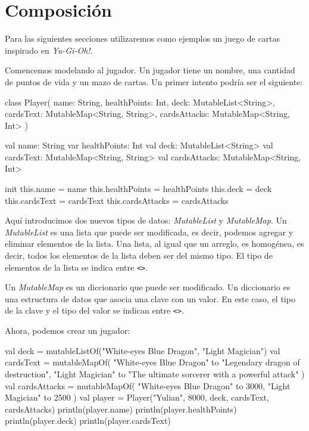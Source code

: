 \section{Composición}
  Para las siguientes secciones utilizaremos como ejemplos un juego de cartas inspirado en
  \textit{Yu-Gi-Oh!}.

  Comencemos modelando al jugador.
  Un jugador tiene un nombre, una cantidad de puntos de vida y un mazo de cartas.
  Un primer intento podría ser el siguiente:

  \begin{kotlin}
    class Player(
      name: String,
      healthPoints: Int,
      deck: MutableList<String>,
      cardsText: MutableMap<String, String>,
      cardsAttacks: MutableMap<String, Int>
    ) {
      val name: String
      var healthPoints: Int
      val deck: MutableList<String>
      val cardsText: MutableMap<String, String>
      val cardsAttacks: MutableMap<String, Int>

      init {
        this.name = name
        this.healthPoints = healthPoints
        this.deck = deck
        this.cardsText = cardsText
        this.cardsAttacks = cardsAttacks
      }
    }
  \end{kotlin}

  Aquí introducimos dos nuevos tipos de datos: \textit{MutableList} y \textit{MutableMap}.
  Un \textit{MutableList} es una lista que puede ser modificada, es decir, podemos agregar y
  eliminar elementos de la lista.
  Una lista, al igual que un arreglo, es homogénea, es decir, todos los elementos de la lista
  deben ser del mismo tipo.
  El tipo de elementos de la lista se indica entre \texttt{<>}.

  Un \textit{MutableMap} es un diccionario que puede ser modificado.
  Un diccionario es una estructura de datos que asocia una clave con un valor.
  En este caso, el tipo de la clave y el tipo del valor se indican entre \texttt{<>}.

  Ahora, podemos crear un jugador:

  \begin{kotlin}
    val deck = mutableListOf("White-eyes Blue Dragon", "Light Magician")
    val cardsText = mutableMapOf(
      "White-eyes Blue Dragon" to "Legendary dragon of destruction",
      "Light Magician" to "The ultimate sorcerer with a powerful attack"
    )
    val cardsAttacks = mutableMapOf(
      "White-eyes Blue Dragon" to 3000,
      "Light Magician" to 2500
    )
    val player = Player("Yulian", 8000, deck, cardsText, cardsAttacks)
    println(player.name)
    println(player.healthPoints)
    println(player.deck)
    println(player.cardsText)
  \end{kotlin}

